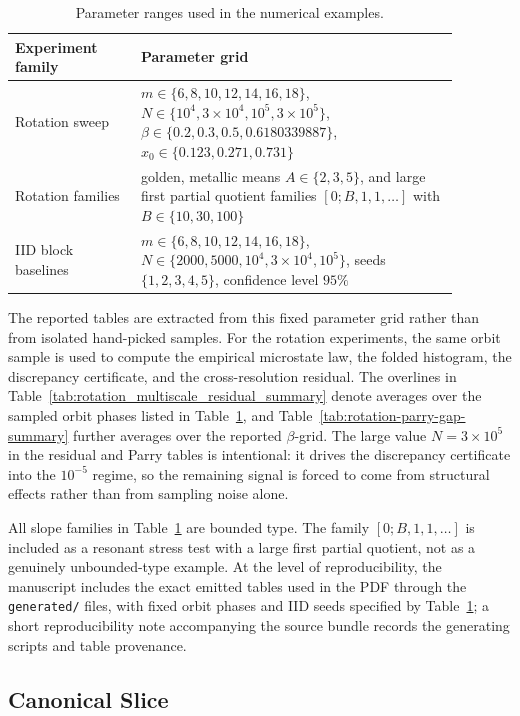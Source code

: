\documentclass[11pt,letterpaper]{article}
\numberwithin{equation}{section}
\theoremstyle{plain}
\theoremstyle{definition}
\theoremstyle{remark}
\begin{document}
\begin{table}[H]
\centering
\small
\begin{tabular}{>{\raggedright\arraybackslash}p{0.25\linewidth} >{\raggedright\arraybackslash}p{0.63\linewidth}}
\toprule
Experiment family & Parameter grid \\
\midrule
Rotation sweep &
$m\in\{6,8,10,12,14,16,18\}$,
$N\in\{10^4,3\times 10^4,10^5,3\times 10^5\}$,
$\beta\in\{0.2,0.3,0.5,0.6180339887\}$,
$x_0\in\{0.123,0.271,0.731\}$ \\
Rotation families &
golden, metallic means $A\in\{2,3,5\}$, and large first partial quotient
families $[0;B,1,1,\dots]$ with $B\in\{10,30,100\}$ \\
IID block baselines &
$m\in\{6,8,10,12,14,16,18\}$,
$N\in\{2000,5000,10^4,3\times 10^4,10^5\}$,
seeds $\{1,2,3,4,5\}$, confidence level $95\%$ \\
\bottomrule
\end{tabular}
\caption{Parameter ranges used in the numerical examples.}
\label{tab:parameter-grid}
\end{table}

The reported tables are extracted from this fixed parameter grid rather than from
isolated hand-picked samples. For the rotation experiments, the same orbit
sample is used to compute the empirical microstate law, the folded histogram,
the discrepancy certificate, and the cross-resolution residual. The overlines
in Table~\ref{tab:rotation_multiscale_residual_summary} denote averages over
the sampled orbit phases listed in Table~\ref{tab:parameter-grid}, and
Table~\ref{tab:rotation-parry-gap-summary} further averages over the reported
\(\beta\)-grid. The large value \(N=3\times 10^5\) in the residual and Parry
tables is intentional: it drives the discrepancy certificate into the
\(10^{-5}\) regime, so the remaining signal is forced to come from structural
effects rather than from sampling noise alone.

All slope families in Table~\ref{tab:parameter-grid} are bounded type. The
family \([0;B,1,1,\dots]\) is included as a resonant stress test with a large
first partial quotient, not as a genuinely unbounded-type example. At the level
of reproducibility, the manuscript includes the exact emitted tables used in
the PDF through the \texttt{generated/} files, with fixed orbit phases and IID
seeds specified by Table~\ref{tab:parameter-grid}; a short reproducibility note
accompanying the source bundle records the generating scripts and table
provenance.

\subsection{Canonical Slice}
\end{document}
